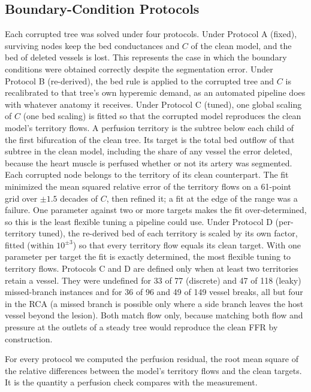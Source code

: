 \documentclass[journal,twoside,web]{ieeecolor}
\begin{document}
\subsection{Boundary-Condition Protocols}
Each corrupted tree was solved under four protocols. Under Protocol A (fixed), surviving
nodes keep the bed conductances and $C$ of the clean model, and the bed of deleted vessels is lost. This represents
the case in which the boundary conditions were obtained correctly despite the segmentation error. Under Protocol B
(re-derived), the bed rule is applied to the corrupted tree and $C$ is recalibrated to that tree's own hyperemic
demand, as an automated pipeline does with whatever anatomy it receives. Under Protocol C (tuned), one global
scaling of $C$ (one bed scaling) is fitted so that the corrupted model reproduces the clean model's territory
flows. A perfusion territory is the subtree below each child of
the first bifurcation of the clean tree. Its target is the total bed outflow of that subtree in the clean model,
including the share of any vessel the error deleted, because the heart muscle is perfused whether or not its artery
was segmented. Each corrupted node belongs to the territory of its clean counterpart. The fit minimized the mean squared relative error of the territory flows on a 61-point grid over $\pm 1.5$ decades
of $C$, then refined it; a fit at the edge of the range was a failure.
One parameter against two or more targets makes the fit over-determined, so this is the least flexible tuning a
pipeline could use. Under Protocol D (per-territory tuned), the re-derived bed of each territory is scaled by its
own factor, fitted (within $10^{\pm 3}$) so that every territory flow equals its clean target. With one parameter per target the fit is
exactly determined, the most flexible tuning to territory flows. Protocols C and D are defined only when at least two territories retain a vessel. They were undefined for 33 of
77 (discrete) and 47 of 118 (leaky) missed-branch instances and for 36 of 96 and 49 of 149 vessel breaks, all but
four in the RCA (a missed branch is possible only where a side branch leaves the host vessel beyond the lesion). Both match
flow only, because matching both flow and pressure at the outlets of a steady tree would reproduce the clean FFR by
construction.

For every protocol we computed the perfusion residual, the root mean square of the relative differences between the
model's territory flows and the clean targets. It is the quantity a perfusion check compares with the measurement.
\end{document}
